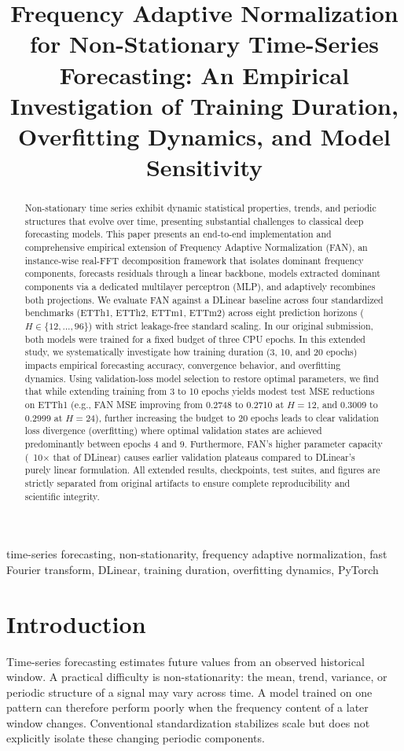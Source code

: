 \documentclass[conference,10pt]{IEEEtran}
\title{Frequency Adaptive Normalization for Non-Stationary Time-Series Forecasting: An Empirical Investigation of Training Duration, Overfitting Dynamics, and Model Sensitivity}
\author{
\IEEEauthorblockN{Meet Dhorajiya (202451053) \quad
Daksh Amalseda (202451012) \quad
Keval Chorada (202451089)}
\IEEEauthorblockA{Artificial Intelligence Project: Non-Stationary Time-Series Forecasting\\
Code Repository: \url{https://github.com/meetdhorajiya/FAN}}
}
\begin{document}
\maketitle

\begin{abstract}
Non-stationary time series exhibit dynamic statistical properties, trends, and periodic structures that evolve over time, presenting substantial challenges to classical deep forecasting models. This paper presents an end-to-end implementation and comprehensive empirical extension of Frequency Adaptive Normalization (FAN), an instance-wise real-FFT decomposition framework that isolates dominant frequency components, forecasts residuals through a linear backbone, models extracted dominant components via a dedicated multilayer perceptron (MLP), and adaptively recombines both projections. We evaluate FAN against a DLinear baseline across four standardized benchmarks (ETTh1, ETTh2, ETTm1, ETTm2) across eight prediction horizons ($H \in \{12, \dots, 96\}$) with strict leakage-free standard scaling. In our original submission, both models were trained for a fixed budget of three CPU epochs. In this extended study, we systematically investigate how training duration (3, 10, and 20 epochs) impacts empirical forecasting accuracy, convergence behavior, and overfitting dynamics. Using validation-loss model selection to restore optimal parameters, we find that while extending training from 3 to 10 epochs yields modest test MSE reductions on ETTh1 (e.g., FAN MSE improving from 0.2748 to 0.2710 at $H=12$, and 0.3009 to 0.2999 at $H=24$), further increasing the budget to 20 epochs leads to clear validation loss divergence (overfitting) where optimal validation states are achieved predominantly between epochs 4 and 9. Furthermore, FAN's higher parameter capacity (~10$\times$ that of DLinear) causes earlier validation plateaus compared to DLinear's purely linear formulation. All extended results, checkpoints, test suites, and figures are strictly separated from original artifacts to ensure complete reproducibility and scientific integrity.
\end{abstract}

\begin{IEEEkeywords}
time-series forecasting, non-stationarity, frequency adaptive normalization, fast Fourier transform, DLinear, training duration, overfitting dynamics, PyTorch
\end{IEEEkeywords}

\section{Introduction}
Time-series forecasting estimates future values from an observed historical window. A practical difficulty is non-stationarity: the mean, trend, variance, or periodic structure of a signal may vary across time. A model trained on one pattern can therefore perform poorly when the frequency content of a later window changes. Conventional standardization stabilizes scale but does not explicitly isolate these changing periodic components.
\end{document}
